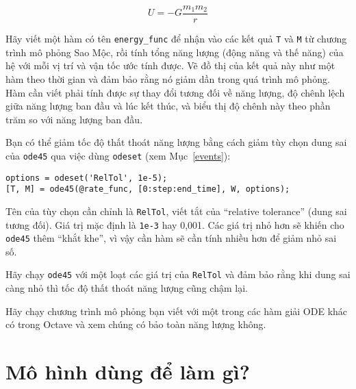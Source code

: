 \documentclass[12pt]{book}
\begin{document}
\[ U = -G \frac{m_1 m_2}{r}  \]
%

\begin{ex}
Hãy viết một hàm có tên \verb#energy_func# để nhận vào các kết quả 
{\tt T} và {\tt M} từ chương trình mô phỏng Sao Mộc, rồi tính tổng
năng lượng (động năng và thế năng) của hệ với mỗi vị trí và vận tốc
ước tính được. Vẽ đồ thị của kết quả này như một hàm theo thời gian
và đảm bảo rằng nó giảm dần trong quá trình mô phỏng. Hàm cần viết
phải tính được sự thay đổi tương đối về năng lượng, độ chênh lệch giữa
năng lượng ban đầu và lúc kết thúc, và biểu thị độ chênh này theo phần
trăm so với năng lượng ban đầu.
\end{ex}

Bạn có thể giảm tốc độ thất thoát năng lượng bằng cách giảm tùy chọn
dung sai của {\tt ode45} qua việc dùng {\tt odeset} (xem Mục~\ref{events}):

\begin{verbatim}
options = odeset('RelTol', 1e-5);
[T, M] = ode45(@rate_func, [0:step:end_time], W, options);
\end{verbatim}
%
Tên của tùy chọn cần chỉnh là {\tt RelTol}, viết tắt của ``relative tolerance''
(dung sai tương đối). Giá trị mặc định là {\tt 1e-3} hay 0,001.  Các giá trị
nhỏ hơn sẽ khiến cho {\tt ode45} thêm ``khắt khe'', vì vậy cần hàm sẽ
cần tính nhiều hơn để giảm nhỏ sai số.

\begin{ex}
Hãy chạy {\tt ode45} với một loạt các giá trị của {\tt RelTol} và đảm bảo rằng
khi dung sai càng nhỏ thì tốc độ thất thoát năng lượng cũng chậm lại.
\end{ex}

\begin{ex}
Hãy chạy chương trình mô phỏng bạn viết với một trong các hàm giải ODE
khác có trong Octave và xem chúng có bảo toàn năng lượng không.
\end{ex}



\section{Mô hình dùng để làm gì?}
\end{document}
